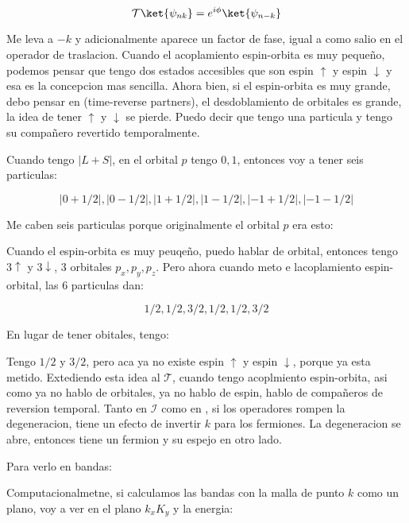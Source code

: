 \documentclass[11pt,fleqn]{book}
\begin{document}
\begin{equation}
    \mathcal{T}\ket{\psi_{nk}}=e^{i\phi}\ket{\psi_{n-k}}    
\end{equation}

Me leva a $-k$ y adicionalmente aparece un factor de fase, igual a como salio en el operador de traslacion. Cuando el acoplamiento espin-orbita es muy pequeño, podemos pensar que tengo dos estados accesibles que son espin $\uparrow$ y espin $\downarrow$ y esa es la concepcion mas sencilla. Ahora bien, si el espin-orbita es muy grande, debo pensar en (time-reverse partners), el desdoblamiento de orbitales es grande, la idea de tener $\uparrow$ y $\downarrow$ se pierde. Puedo decir que tengo una particula y tengo su compañero revertido temporalmente. 

Cuando tengo $|L+S|$, en el orbital $p$ tengo $0,1$, entonces voy a tener seis particulas:

$$|0+1/2|,|0-1/2|,|1+1/2|,|1-1/2|,|-1+1/2|,|-1-1/2|$$

Me caben seis particulas porque originalmente el orbital $p$ era esto:


Cuando el espin-orbita es muy peuqeño, puedo hablar de orbital, entonces tengo $3\uparrow$  y $3\downarrow$, 3 orbitales $p_{x},p_{y},p_{z}$. Pero ahora cuando meto e lacoplamiento espin-orbital, las 6 particulas dan:

$$1/2, 1/2, 3/2, 1/2, 1/2, 3/2$$

En lugar de tener obitales, tengo:


Tengo $1/2$ y $3/2$, pero aca ya no existe espin $\uparrow$ y espin $\downarrow$, porque ya esta metido. Extediendo esta idea al $\mathcal{T}$, cuando tengo acoplmiento espin-orbita, asi como ya no hablo de orbitales, ya no hablo de espin, hablo de  compañeros de reversion temporal. Tanto en $\mathcal{I}$ como en , si los operadores rompen la degeneracion, tiene un efecto de invertir $k$ para los fermiones. La degeneracion se abre, entonces tiene un fermion y su espejo en otro lado. 

Para verlo en bandas:


Computacionalmetne, si calculamos las bandas con la malla de punto $k$ como un plano, voy a ver en el plano $k_{x}K_{y}$ y la energia:

\end{document}
